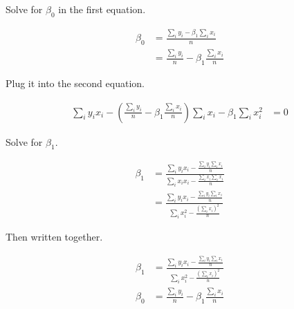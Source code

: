 Solve for $\beta_0$ in the first equation.

\begin{align}
 \beta_0   &= \frac{\sum_i y_i - \beta_1 \sum_i x_i}{n} \\
 &= \frac{\sum_i y_i}{n} - \beta_1 \frac{\sum_i x_i}{n} 
\end{align}

Plug it into the second equation.

\begin{align}
 \sum_i y_i x_i - (\frac{\sum_i y_i}{n} - \beta_1 \frac{ \sum_i x_i}{n}) \sum_i x_i - \beta_1 \sum_i x_i^2  &= 0 
\end{align}

Solve for $\beta_1$.

\begin{align}
 \beta_1 &= \frac{ \sum_i y_i x_i - \frac{\sum_i y_i \sum_i x_i}{n} }{ \sum_i x_i x_i - \frac{\sum_i x_i \sum_i x_i}{n} } \\
 &= \frac{ \sum_i y_i x_i - \frac{\sum_i y_i \sum_i x_i}{n} }{ \sum_i x_i^2 - \frac{ (\sum_i x_i)^2 } {n} }
\end{align}

Then written together.

\begin{align}
  \beta_1 &= \frac{ \sum_i y_i x_i - \frac{\sum_i y_i \sum_i x_i}{n} }{ \sum_i x_i^2 - \frac{ (\sum_i x_i)^2 } {n} } \\
  \beta_0 &= \frac{\sum_i y_i}{n} - \beta_1 \frac{\sum_i x_i}{n}
\end{align}
